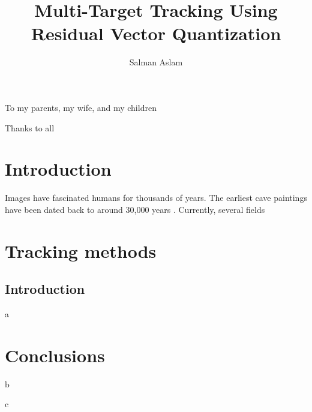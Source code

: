 \documentclass[12pt,letterpaper,doublespaced,ETD]{gt-ece-thesis} %
\title{Multi-Target Tracking Using Residual Vector Quantization}
\author{Salman Aslam}
\begin{document}
	
	\pagestyle{plain}
	

	\begin{FrontMatter}
		\contents %
	\end{FrontMatter}
	\begin{dedication}
		To my parents, my wife, and my children
	\end{dedication}
	\begin{acknowledgement}
		Thanks to all \newpage
	\end{acknowledgement}
	\begin{Body}	
		
\chapter{Introduction}
\label{chap_Introduction}	
\par
Images have fascinated humans for thousands of years.  The earliest cave paintings have been dated back to around 30,000 years \cite{2009_WEB_EarliestHumanPaintings_Gray}.  Currently, several fields 




\chapter{Tracking methods}
\label{chap_tracking_methods}	
\section{Introduction}
a



\chapter{Conclusions}
\label{chap_Conclusions}	
b

\label{app:AppendixA}
c










\end{Body}
\begin{EndMatter}
\end{EndMatter}
\end{document}
